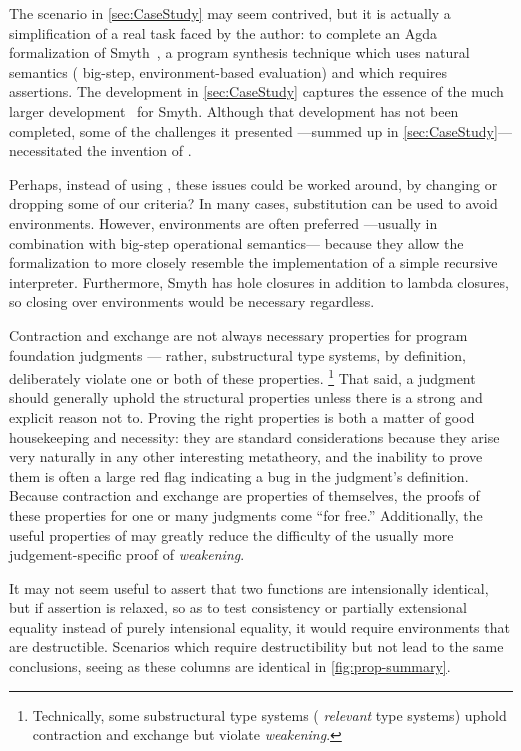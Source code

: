 
The scenario in \autoref{sec:CaseStudy} may seem contrived, but it is actually a simplification of a real task faced by the author:
%
to complete an Agda formalization of Smyth~\citep{smyth}, a program synthesis technique which uses
natural semantics (\ie{} big-step, environment-based evaluation) and which requires assertions.
%
The development in \autoref{sec:CaseStudy} captures the essence of the much larger development~\citep{github:smyth:agda} for Smyth.
%
Although that development has not been completed, some of the challenges it presented ---summed up in \autoref{sec:CaseStudy}--- necessitated the invention of \dds.

Perhaps, instead of using \dds, these issues could be worked around, by changing or dropping some of our criteria?
In many cases, substitution can be used to avoid environments. However, environments are often preferred ---usually in combination with big-step operational semantics--- because
they allow the formalization to more closely resemble the implementation of a simple recursive interpreter. Furthermore,
Smyth has hole closures in addition to lambda closures, so closing over environments would be necessary regardless.

Contraction and exchange are not always necessary properties for program foundation judgments ---
rather, substructural type systems, by definition, deliberately violate one or both of these properties.%
\footnote{\hspace{0.01in}Technically, some substructural type systems (\eg{} \emph{relevant} type systems) uphold contraction and exchange but violate \emph{weakening}.}
That said, a judgment should generally uphold the structural properties unless there is a strong and explicit
reason not to. Proving the right properties
is both a matter of good housekeeping and necessity: they are standard
considerations because they arise very naturally in any other
interesting metatheory, and the inability to prove them is often a large red flag indicating a bug in the judgment's definition.
Because contraction and exchange are properties of \dds{} themselves,
the proofs of these properties for one or many judgments come ``for free.''
Additionally, the useful properties of \dds{} may greatly reduce the difficulty of the usually
more judgement-specific proof of \emph{weakening}.

It may not seem useful to assert that two functions are intensionally identical, but if assertion is relaxed,
so as to test consistency or partially extensional equality instead of purely intensional equality,
it would require environments that are destructible.
Scenarios which require destructibility but not \EqDec{} lead to the same conclusions,
seeing as these columns are identical in \autoref{fig:prop-summary}.

